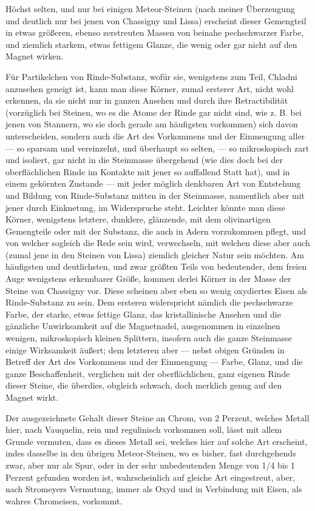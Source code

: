 \documentclass[a4paper, 11pt, oneside, german]{article}
\begin{document}
Höchst selten, und nur bei einigen Meteor-Steinen (nach meiner Überzeugung und deutlich nur bei jenen von Chassigny und Lissa) erscheint dieser Gemengteil in etwas größeren, ebenso zerstreuten Massen von beinahe pechschwarzer Farbe, und ziemlich starkem, etwas fettigem Glanze, die wenig oder gar nicht auf den Magnet wirken.

Für Partikelchen von Rinde-Substanz, wofür sie, wenigstens zum Teil, Chladni anzusehen geneigt ist, kann man diese Körner, zumal ersterer Art, nicht wohl erkennen, da sie nicht nur in ganzen Ansehen und durch ihre Retractibilität (vorzüglich bei Steinen, wo es die Atome der Rinde gar nicht sind, wie z. B. bei jenen von Stannern, wo sie doch gerade am häufigsten vorkommen) sich davon unterscheiden, sondern auch die Art des Vorkommens und der Einmengung aller --- so sparsam und vereinzelnt, und überhaupt so selten, --- so mikroskopisch zart und isoliert, gar nicht in die Steinmasse übergehend (wie dies doch bei der oberflächlichen Rinde im Kontakte mit jener so auffallend Statt hat), und in einem gekörnten Zustande --- mit jeder möglich denkbaren Art von Entstehung und Bildung von Rinde-Substanz mitten in der Steinmasse, namentlich aber mit jener durch Einknetung, im Widerspruche steht. Leichter könnte man diese Körner, wenigstens letztere, dunklere, glänzende, mit dem olivinartigen Gemengteile oder mit der Substanz, die auch in Adern vorzukommen pflegt, und von welcher sogleich die Rede sein wird, verwechseln, mit welchen diese aber auch (zumal jene in den Steinen von Lissa) ziemlich gleicher Natur sein möchten. Am häufigsten und deutlichsten, und zwar größten Teils von bedeutender, dem freien Auge wenigstens erkennbarer Größe, kommen derlei Körner in der Masse der Steine von Chassigny vor. Diese scheinen aber eben so wenig oxydiertes Eisen als Rinde-Substanz zu sein. Dem ersteren widerspricht nämlich die pechschwarze Farbe, der starke, etwas fettige Glanz, das kristallinische Ansehen und die gänzliche Unwirksamkeit auf die Magnetnadel, ausgenommen in einzelnen wenigen, mikroskopisch kleinen Splittern, insofern auch die ganze Steinmasse einige Wirksamkeit äußert; dem letzteren aber --- nebst obigen Gründen in Betreff der Art des Vorkommens und der Einmengung --- Farbe, Glanz, und die ganze Beschaffenheit, verglichen mit der oberflächlichen, ganz eigenen Rinde dieser Steine, die überdies, obgleich schwach, doch merklich genug auf den Magnet wirkt.

Der ausgezeichnete Gehalt dieser Steine an Chrom, von 2 Perzent, welches Metall hier, nach Vauquelin, rein und regulinisch vorkommen soll, lässt mit allem Grunde vermuten, dass es dieses Metall sei, welches hier auf solche Art erscheint, indes dasselbe in den übrigen Meteor-Steinen, wo es bisher, fast durchgehends zwar, aber nur als Spur, oder in der sehr unbedeutenden Menge von 1/4 bis 1 Perzent gefunden worden ist, wahrscheinlich auf gleiche Art eingestreut, aber, nach Stromeyers Vermutung, immer als Oxyd und in Verbindung mit Eisen, als wahres Chromeisen, vorkommt.
\end{document}
